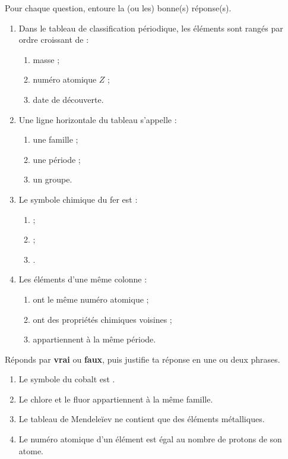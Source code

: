 \documentclass[11pt]{article}
\begin{document}
\begin{exercice}
Pour chaque question, entoure la (ou les) bonne(s) réponse(s).
\begin{enumerate}
\item Dans le tableau de classification périodique, les éléments sont rangés par ordre croissant de :
\begin{enumerate}
\item masse ;
\item numéro atomique $Z$ ;
\item date de découverte.
\end{enumerate}
\item Une ligne horizontale du tableau s'appelle :
\begin{enumerate}
\item une famille ;
\item une période ;
\item un groupe.
\end{enumerate}
\item Le symbole chimique du fer est :
\begin{enumerate}
\item {} ;
\item {} ;
\item {}.
\end{enumerate}
\item Les éléments d'une même colonne :
\begin{enumerate}
\item ont le même numéro atomique ;
\item ont des propriétés chimiques voisines ;
\item appartiennent à la même période.
\end{enumerate}
\end{enumerate}
\end{exercice}

\begin{exercice}
Réponds par \textbf{vrai} ou \textbf{faux}, puis justifie ta réponse en une ou deux phrases.
\begin{enumerate}
\item Le symbole du cobalt est .
\item Le chlore  et le fluor  appartiennent à la même famille.
\item Le tableau de Mendeleïev ne contient que des éléments métalliques.
\item Le numéro atomique d'un élément est égal au nombre de protons de son atome.
\end{enumerate}
\end{exercice}
\end{document}
